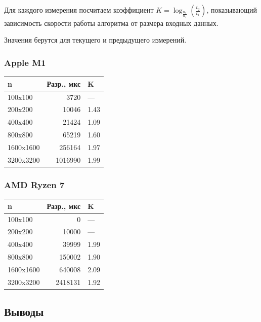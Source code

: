 \documentclass[a4paper,12pt]{extarticle}
\begin{document}
Для каждого измерения посчитаем коэффициент $K = \log_{\frac{n_2}{n_1}} \left ({\frac{t_2}{t_1}}\right )$, показывающий зависимость скорости работы алгоритма от размера входных данных.

Значения берутся для текущего и предыдущего измерений.

\subsubsection{Apple M1}

\begin{tabular}{ |l|r|l| }
\hline
\textbf{n} & \textbf{Разр., мкс} & \textbf{K} \\ \hline


100x100 & 3720 & --- \\ \hline
200x200 & 10046 & 1.43 \\ \hline
400x400 & 21424 & 1.09 \\ \hline
800x800 & 65219 & 1.60 \\ \hline
1600x1600 & 256164 & 1.97 \\ \hline
3200x3200 & 1016990 & 1.99 \\ \hline

\end{tabular}

\subsubsection{AMD Ryzen 7}

\begin{tabular}{ |l|r|l| }
\hline
\textbf{n} & \textbf{Разр., мкс} & \textbf{K} \\ \hline


100x100 & 0 & --- \\ \hline
200x200 & 10000 & --- \\ \hline
400x400 & 39999 & 1.99 \\ \hline
800x800 & 150002 & 1.90 \\ \hline
1600x1600 & 640008 & 2.09 \\ \hline
3200x3200 & 2418131 & 1.92 \\ \hline

\end{tabular}


\subsection{Выводы}
\end{document}
